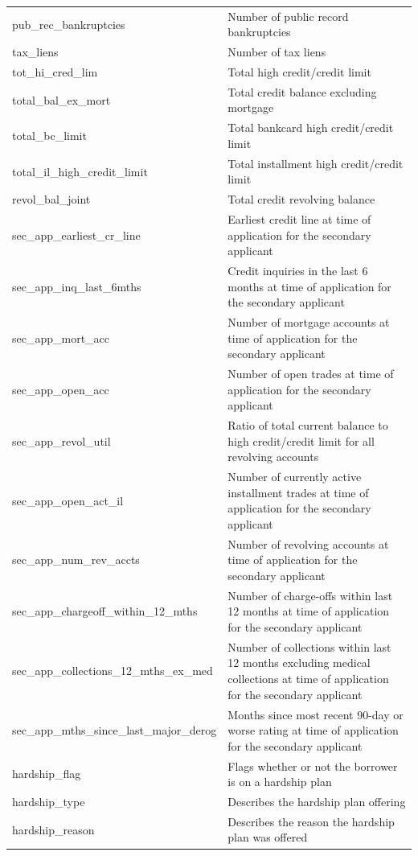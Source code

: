 \documentclass[11pt,]{report}
\begin{document}
\begin{longtable}[t]{>{\raggedright\arraybackslash}p{7cm}>{\raggedright\arraybackslash}p{7cm}}
pub\_rec\_bankruptcies & Number of public record bankruptcies\\
tax\_liens & Number of tax liens\\
\addlinespace
tot\_hi\_cred\_lim & Total high credit/credit limit\\
total\_bal\_ex\_mort & Total credit balance excluding mortgage\\
total\_bc\_limit & Total bankcard high credit/credit limit\\
total\_il\_high\_credit\_limit & Total installment high credit/credit limit\\
revol\_bal\_joint & Total credit revolving balance\\
\addlinespace
sec\_app\_earliest\_cr\_line & Earliest credit line at time of application for the secondary applicant\\
sec\_app\_inq\_last\_6mths & Credit inquiries in the last 6 months at time of application for the secondary applicant\\
sec\_app\_mort\_acc & Number of mortgage accounts at time of application for the secondary applicant\\
sec\_app\_open\_acc & Number of open trades at time of application for the secondary applicant\\
sec\_app\_revol\_util & Ratio of total current balance to high credit/credit limit for all revolving accounts\\
\addlinespace
sec\_app\_open\_act\_il & Number of currently active installment trades at time of application for the secondary applicant\\
sec\_app\_num\_rev\_accts & Number of revolving accounts at time of application for the secondary applicant\\
sec\_app\_chargeoff\_within\_12\_mths & Number of charge-offs within last 12 months at time of application for the secondary applicant\\
sec\_app\_collections\_12\_mths\_ex\_med & Number of collections within last 12 months excluding medical collections at time of application for the secondary applicant\\
sec\_app\_mths\_since\_last\_major\_derog & Months since most recent 90-day or worse rating at time of application for the secondary applicant\\
\addlinespace
hardship\_flag & Flags whether or not the borrower is on a hardship plan\\
hardship\_type & Describes the hardship plan offering\\
hardship\_reason & Describes the reason the hardship plan was offered\\

\end{longtable}
\end{document}
